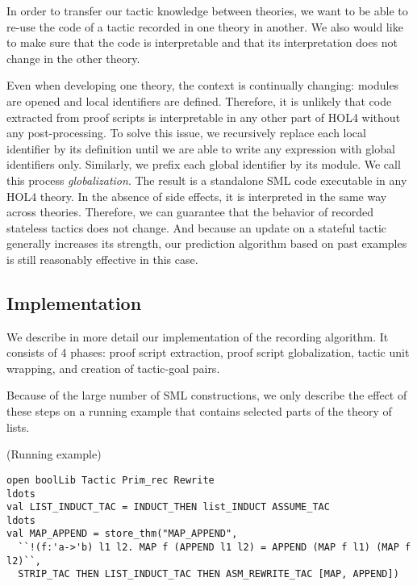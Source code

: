 \documentclass[runningheads,a4paper,draft]{svjour3}
\def\holfour{\textsf{HOL4}\xspace}
\def\sml{\textsf{SML}\xspace}
\begin{document}
In order to transfer our tactic knowledge between theories, we want to be able
to re-use the code of a tactic recorded in one theory in another. 
We also would like to make sure that the code is interpretable and that
its interpretation does not change in the other theory.

Even when developing one theory, the context is continually changing:
modules are opened and local identifiers are defined. Therefore, it is unlikely
that code extracted from proof scripts is interpretable in any other part of
\holfour without any post-processing.
To solve this issue, we recursively replace each local identifier by its
definition until we are able to write any expression with global identifiers
only. Similarly, we prefix each global identifier by its module.
We call this process \emph{globalization}. The result is a standalone \sml code
executable in any \holfour theory.  In the absence of side effects, it is
interpreted in the same way across theories.
Therefore, we can guarantee that the behavior of recorded stateless tactics
does not change. And because an update on a stateful tactic
generally increases its strength, our prediction algorithm based on past
examples is still reasonably effective in this case.

\subsection{Implementation}
We describe in more detail our implementation of the recording algorithm. It
consists of 4 phases: proof script extraction, proof script globalization,
tactic unit wrapping, and creation of tactic-goal pairs.

Because of the large number of \sml constructions, we only describe the effect
of these steps on a running example that contains selected parts of the theory
of lists.


\begin{example}\label{ex:running}(Running example)
\small
\begin{lstlisting}[language=SMLSmall]
open boolLib Tactic Prim_rec Rewrite
ldots
val LIST_INDUCT_TAC = INDUCT_THEN list_INDUCT ASSUME_TAC
ldots
val MAP_APPEND = store_thm("MAP_APPEND",
  ``!(f:'a->'b) l1 l2. MAP f (APPEND l1 l2) = APPEND (MAP f l1) (MAP f l2)``,
  STRIP_TAC THEN LIST_INDUCT_TAC THEN ASM_REWRITE_TAC [MAP, APPEND])
\end{lstlisting}
\end{example}
\end{document}
